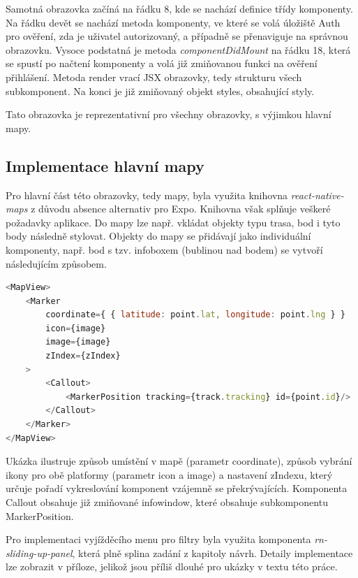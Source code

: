 Samotná obrazovka začíná na řádku 8, kde se nachází definice třídy komponenty. Na řádku devět se nachází metoda komponenty, ve které se volá úložiště Auth pro ověření, zda je uživatel autorizovaný, a případně se přenaviguje na správnou obrazovku. Vysoce podstatná je metoda \emph{componentDidMount} na řádku 18, která se spustí po načtení komponenty a volá již zmiňovanou funkci na ověření přihlášení. Metoda render vrací JSX obrazovky, tedy strukturu všech subkomponent. Na konci je již zmiňovaný objekt styles, obsahující styly.

Tato obrazovka je reprezentativní pro všechny obrazovky, s výjimkou hlavní mapy.

\subsection{Implementace hlavní mapy}

Pro hlavní část této obrazovky, tedy mapy, byla využita knihovna \emph{react-native-maps} z důvodu absence alternativ pro Expo. Knihovna však splňuje veškeré požadavky aplikace. Do mapy lze např. vkládat objekty typu trasa, bod i tyto body následně stylovat. Objekty do mapy se přidávají jako individuální komponenty, např. bod s tzv. infoboxem (bublinou nad bodem) se vytvoří následujícím způsobem.

\begin{lstlisting}[language=JavaScript, caption=Ukázka implementace obrazovky]
<MapView>
	<Marker
		coordinate={ { latitude: point.lat, longitude: point.lng } }
		icon={image}
		image={image}
		zIndex={zIndex}
	>
		<Callout>
			<MarkerPosition tracking={track.tracking} id={point.id}/>
		</Callout>
	</Marker>
</MapView>
\end{lstlisting}

Ukázka ilustruje způsob umístění v mapě (parametr coordinate), způsob vybrání ikony pro obě platformy (parametr icon a image) a nastavení zIndexu, který určuje pořadí vykreslování komponent vzájemně se překrývajících. Komponenta Callout obsahuje již zmiňované infowindow, které obsahuje subkomponentu MarkerPosition.

Pro implementaci vyjížděcího menu pro filtry byla využita komponenta \emph{rn-sliding-up-panel}, která plně splina zadání z kapitoly návrh. Detaily implementace lze zobrazit v příloze, jelikož jsou příliš dlouhé pro ukázky v textu této práce.

